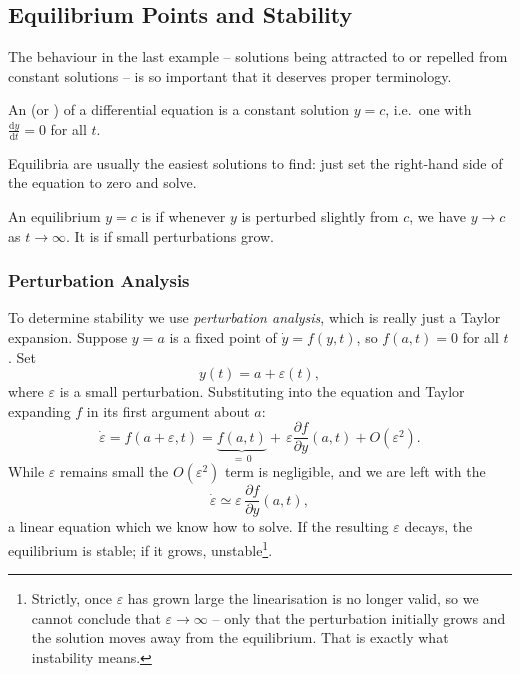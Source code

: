 \documentclass[a4paper]{scrartcl}
\begin{document}
\subsection{Equilibrium Points and Stability}

The behaviour in the last example -- solutions being attracted to or repelled from constant solutions -- is so important that it deserves proper terminology.

\begin{definition}
	An  (or ) of a differential equation is a constant solution $y = c$, i.e.\ one with $\frac{\mathrm{d}y}{\mathrm{d}t} = 0$ for all $t$.
\end{definition}

Equilibria are usually the easiest solutions to find: just set the right-hand side of the equation to zero and solve.

\begin{definition}[Stability]
	An equilibrium $y = c$ is  if whenever $y$ is perturbed slightly from $c$, we have $y \to c$ as $t \to \infty$. It is  if small perturbations grow.
\end{definition}

\subsubsection{Perturbation Analysis}

To determine stability we use \emph{perturbation analysis}, which is really just a Taylor expansion. Suppose $y = a$ is a fixed point of $\dot{y} = f(y, t)$, so $f(a, t) = 0$ for all $t$. Set
$$
y(t) = a + \varepsilon(t),
$$
where $\varepsilon$ is a small perturbation. Substituting into the equation and Taylor expanding $f$ in its first argument about $a$:
$$
\dot{\varepsilon} = f(a + \varepsilon, t) = \underbrace{f(a, t)}_{= \, 0} + \, \varepsilon \frac{\partial f}{\partial y}(a, t) + O(\varepsilon^2).
$$
While $\varepsilon$ remains small the $O(\varepsilon^2)$ term is negligible, and we are left with the 
$$
\dot{\varepsilon} \simeq \varepsilon \, \frac{\partial f}{\partial y}(a, t),
$$
a linear equation which we know how to solve. If the resulting $\varepsilon$ decays, the equilibrium is stable; if it grows, unstable\footnote{Strictly, once $\varepsilon$ has grown large the linearisation is no longer valid, so we cannot conclude that $\varepsilon \to \infty$ -- only that the perturbation initially grows and the solution moves away from the equilibrium. That is exactly what instability means.}.
\end{document}
